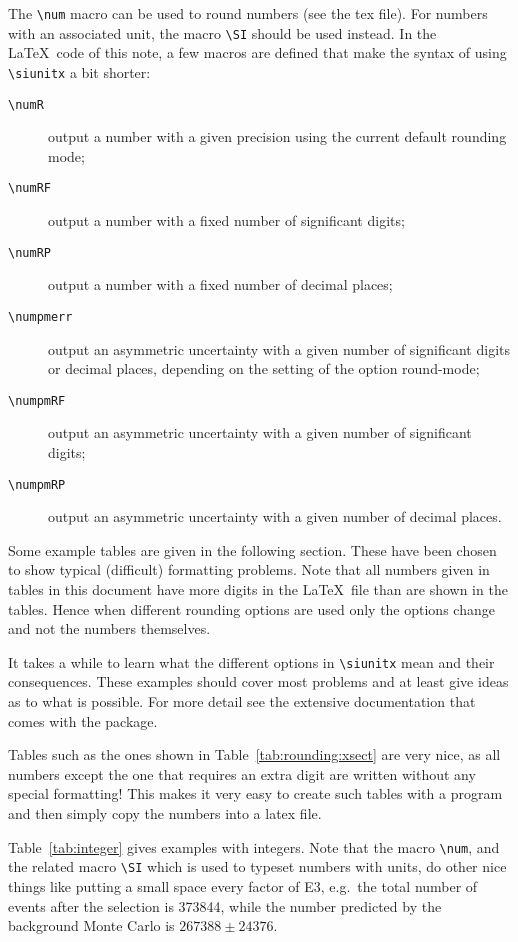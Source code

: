 \documentclass[UKenglish]{style/atlasdoc}
\newcommand*{\numRF}[2]{\num[round-mode=figures,round-precision=#2]{#1}}
\newcommand*\Macro[1]{\texttt{\textbackslash#1}}
\begin{document}
The \Macro{num} macro can be used to round numbers (see the tex file). For numbers with
an associated unit, the macro \Macro{SI} should be used instead.
In the \LaTeX\ code of this note, a few macros are defined that make the
syntax of using \Macro{siunitx} a bit shorter:
\begin{description}
\item[\Macro{numR}] output a number with a given precision using the
  current default rounding mode;
\item[\Macro{numRF}] output a number with a fixed number of significant digits;
\item[\Macro{numRP}] output a number with a fixed number of decimal places;
\item[\Macro{numpmerr}] output an asymmetric uncertainty with a given number
  of significant digits or decimal places, depending on the setting of
  the option \textsf{round-mode};
\item[\Macro{numpmRF}] output an asymmetric uncertainty with a given number
  of significant digits;
\item[\Macro{numpmRP}] output an asymmetric uncertainty with a given number
  of decimal places.
\end{description}


Some example tables are given in the following section. These have
been chosen to show typical (difficult) formatting problems.  Note
that all numbers given in tables in this document have more digits in
the \LaTeX\ file than are shown in the tables. Hence when different
rounding options are used only the options change and not the numbers
themselves.

It takes a while to learn what the different options in
\Macro{siunitx} mean and their consequences. These
examples should cover most problems and at least give ideas as to what is
possible. For more detail see the extensive documentation that comes
with the package.

Tables such as the ones shown in
Table~\ref{tab:rounding:xsect} are very nice, as all numbers except the
one that requires an extra digit are written without any special
formatting! This makes it very easy to create such tables with a
program and then simply copy the numbers into a latex file.

Table~\ref{tab:integer} gives examples with integers. Note that the
macro \Macro{num}, and the related macro \Macro{SI} which is used to
typeset numbers with units, do other nice things like putting a
small space every factor of \num{E3}, e.g.\ the total number of events
after the selection is \num{373844}, while the number predicted by
the background Monte Carlo is
$\numRF{267388}{3} \pm \numRF{24376}{2}$.
\end{document}
